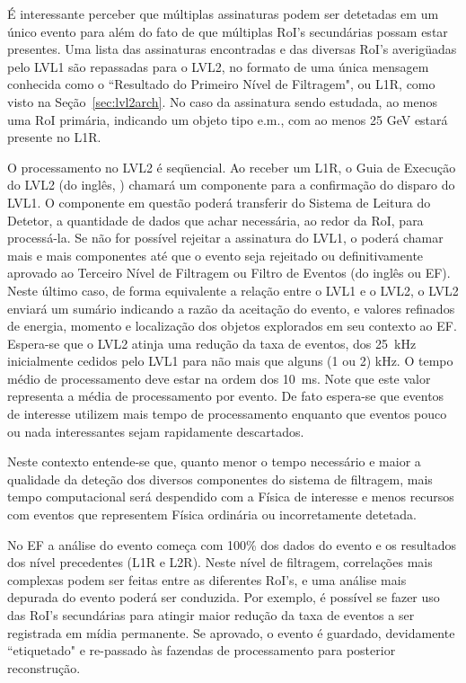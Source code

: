 É interessante perceber que múltiplas assinaturas podem ser detetadas em um
único evento para além do fato de que múltiplas RoI's secundárias possam estar
presentes. Uma lista das assinaturas encontradas e das diversas RoI's
averigüadas pelo LVL1 são repassadas para o LVL2, no formato de uma única
mensagem conhecida como o ``Resultado do Primeiro Nível de Filtragem", ou L1R,
como visto na Seção~\ref{sec:lvl2arch}. No caso da assinatura sendo estudada,
ao menos uma RoI primária, indicando um objeto tipo e.m., com ao menos 25 GeV
estará presente no L1R.

O processamento no LVL2 é seqüencial. Ao receber um L1R, o Guia de Execução do
LVL2 (do inglês, ) chamará um componente para a confirmação do
disparo do LVL1. O componente em questão poderá transferir do Sistema de
Leitura do Detetor, a quantidade de dados que achar necessária, ao redor da
RoI, para processá-la. Se não for possível rejeitar a assinatura do LVL1, o
 poderá chamar mais e mais componentes até que o evento seja
rejeitado ou definitivamente aprovado ao Terceiro Nível de Filtragem ou Filtro
de Eventos (do inglês  ou EF). Neste último caso, de forma
equivalente a relação entre o LVL1 e o LVL2, o LVL2 enviará um sumário
indicando a razão da aceitação do evento, e valores refinados de energia,
momento e localização dos objetos explorados em seu contexto ao EF. Espera-se
que o LVL2 atinja uma redução da taxa de eventos, dos 25~kHz inicialmente
cedidos pelo LVL1 para não mais que alguns (1 ou 2) kHz. O tempo médio de
processamento deve estar na ordem dos 10~ms. Note que este valor representa a
média de processamento por evento. De fato espera-se que eventos de interesse
utilizem mais tempo de processamento enquanto que eventos pouco ou nada
interessantes sejam rapidamente descartados.

Neste contexto entende-se que, quanto menor o tempo necessário e maior a
qualidade da deteção dos diversos componentes do sistema de filtragem, mais
tempo computacional será despendido com a Física de interesse e menos recursos
com eventos que representem Física ordinária ou incorretamente detetada.

No EF a análise do evento começa com 100\% dos dados do evento e os resultados
dos nível precedentes (L1R e L2R). Neste nível de filtragem, correlações mais
complexas podem ser feitas entre as diferentes RoI's, e uma análise mais
depurada do evento poderá ser conduzida. Por exemplo, é possível se fazer uso
das RoI's secundárias para atingir maior redução da taxa de eventos a ser
registrada em mídia permanente. Se aprovado, o evento é guardado, devidamente
``etiquetado" e re-passado às fazendas de processamento  para
posterior reconstrução.

